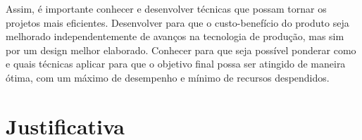 Assim, é importante conhecer e desenvolver técnicas que possam tornar os projetos mais eficientes. Desenvolver para que o custo-benefício do produto seja melhorado independentemente de avanços na tecnologia de produção, mas sim por um design melhor elaborado. Conhecer para que seja possível ponderar como e quais técnicas aplicar para que o objetivo final possa ser atingido de maneira ótima, com um máximo de desempenho e mínimo de recursos despendidos.



\section{Justificativa} %

%

